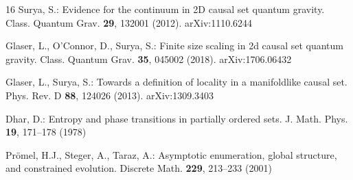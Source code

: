 \documentclass[11pt,a4paper]{article}
\begin{document}
\begin{thebibliography}{16}
Surya, S.: Evidence for the continuum in 2D causal set quantum gravity. Class. Quantum Grav. \textbf{29}, 132001 (2012). arXiv:1110.6244

Glaser, L., O'Connor, D., Surya, S.: Finite size scaling in 2d causal set quantum gravity. Class. Quantum Grav. \textbf{35}, 045002 (2018). arXiv:1706.06432

Glaser, L., Surya, S.: Towards a definition of locality in a manifoldlike causal set. Phys. Rev. D \textbf{88}, 124026 (2013). arXiv:1309.3403

Dhar, D.: Entropy and phase transitions in partially ordered sets. J. Math. Phys. \textbf{19}, 171--178 (1978)

Pr\"omel, H.J., Steger, A., Taraz, A.: Asymptotic enumeration, global structure, and constrained evolution. Discrete Math. \textbf{229}, 213--233 (2001)

\end{thebibliography}
\end{document}
